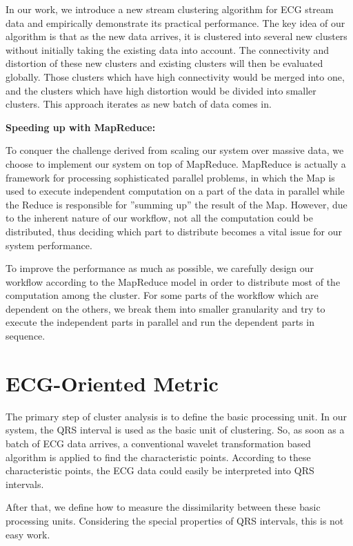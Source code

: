 \documentclass[conference]{IEEEtran}
\begin{document}
In our work, we introduce a new stream clustering algorithm for ECG stream data and empirically demonstrate its practical performance. The key idea of our algorithm is that as the new data arrives, it is clustered into several new clusters without initially taking the existing data into account. The connectivity and distortion of these new clusters and existing clusters will then be evaluated globally. Those clusters which have high connectivity would be merged into one, and the clusters which have high distortion would be divided into smaller clusters. This approach iterates as new batch of data comes in.


\textbf{Speeding up with MapReduce:}


To conquer the challenge derived from scaling our system over massive data, we choose to implement our system on top of MapReduce. MapReduce is actually a framework for processing sophisticated parallel problems, in which the Map is used to execute independent computation on a part of the data in parallel while the Reduce is responsible for ''summing up'' the result of the Map. However, due to the inherent nature of our workflow, not all the computation could be distributed, thus deciding which part to distribute becomes a vital issue for our system performance.


To improve the performance as much as possible, we carefully design our workflow according to the MapReduce model in order to distribute most of the computation among the cluster. For some parts of the workflow which are dependent on the others, we break them into smaller granularity and try to execute the independent parts in parallel and run the dependent parts in sequence.



\section{ECG-Oriented Metric}
The primary step of cluster analysis is to define the basic processing unit. In our system, the QRS interval is used as the basic unit of clustering. So, as soon as a batch of ECG data arrives, a conventional wavelet transformation based algorithm \cite{li1995detection} is applied to find the characteristic points. According to these characteristic points, the ECG data could easily be interpreted into QRS intervals.

After that, we define how to measure the dissimilarity between these basic processing units. Considering the special properties of QRS intervals, this is not easy work.
\end{document}
